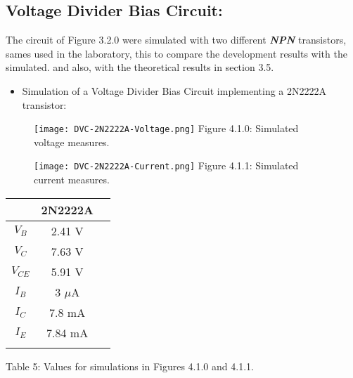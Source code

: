 \subsection{Voltage Divider Bias Circuit:}

The circuit of Figure 3.2.0 were simulated with two different {\bfseries\itshape NPN} transistors, sames used in the laboratory, this to compare the development results with the simulated. and also, with the theoretical results in section 3.5.

{\bfseries\itshape
\begin{itemize}
\item Simulation of a Voltage Divider Bias Circuit implementing a 2N2222A transistor:
\end{itemize}}

\begin{multicols}{2}
\begin{figure}[H]
\texttt{[image: DVC-2N2222A-Voltage.png]}
\centering \linebreak \linebreak Figure 4.1.0: Simulated voltage measures.
\end{figure}

\begin{figure}[H]
\texttt{[image: DVC-2N2222A-Current.png]}
\centering \linebreak \linebreak Figure 4.1.1: Simulated current measures.
\end{figure}
\end{multicols}

\begin{center}
\begin{tabular}[1.5cm]{c c c}
\toprule
\toprule
\centering \hspace{220pt} & \hspace{80pt} {\bfseries 2N2222A} \hspace{80pt} & \\
\midrule
\midrule
$V_{B}$ & 2.41 V \\
\cmidrule{1-3}
$V_{C}$ & 7.63 V \\
\cmidrule{1-3}
$V_{CE}$ & 5.91 V \\
\cmidrule{1-3}
$I_{B}$ & 3 $\mu$A \\
\cmidrule{1-3}
$I_{C}$ & 7.8 mA \\
\cmidrule{1-3}
$I_{E}$ & 7.84 mA \\
\bottomrule
\linebreak
\end{tabular}
\linebreak Table 5: Values for simulations in Figures 4.1.0 and 4.1.1.
\end{center}

